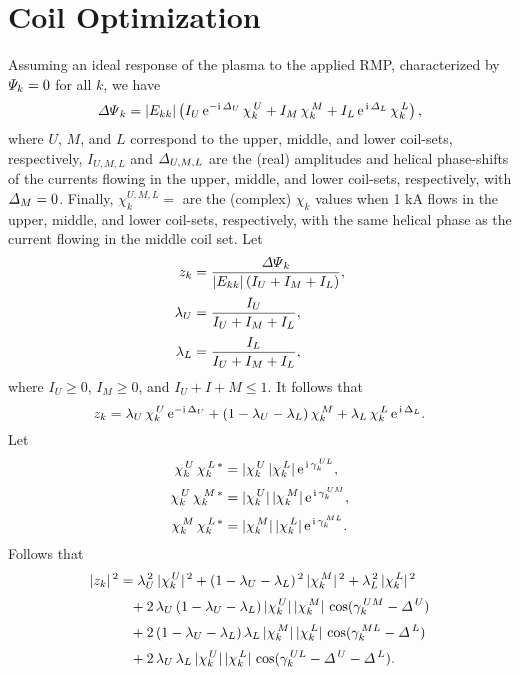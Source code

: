 \documentclass[12pt]{article}
\begin{document}
\section{Coil Optimization}
Assuming an ideal response of the plasma to the applied RMP, characterized by ${\mit\Psi}_k=0$ for all $k$, 
we have
\begin{equation}
{\mit\Delta\Psi}_k = |E_{kk}|\left(
  I_U \, {\rm e}^{-{\rm i}\,{\mit\Delta}_U}\,\chi_k^{\,U}
+I_M\,                                         \chi_k^{\,M}
+I_L \, {\rm e}^{\,{\rm i}\,{\mit\Delta}_L}\,\chi_k^{\,L}
\right),
\end{equation}
where $U$, $M$, and $L$ correspond to the upper, middle, and lower coil-sets, respectively, $I_{U,M,L}$ and ${\mit\Delta}_{U,M,L}$
are the (real) amplitudes and helical phase-shifts of the currents flowing in the upper, middle, and lower coil-sets, respectively, with ${\mit\Delta}_M=0$.  Finally, $\chi_k^{U,M,L}=$ are the (complex) $\chi_k$ values when 1 kA flows in the upper, middle, and lower coil-sets, respectively,
with the same helical phase as the current flowing in the middle coil set.
Let
\begin{align}
z_k& =\frac{ {\mit\Delta\Psi}_k }{ |E_{kk}|\,(I_U+I_M+I_L)},\\[0.5ex]
\lambda_U&=\frac{I_{U}}{I_U+I_{M}+I_L},\\[0.5ex]
\lambda_L&=\frac{I_{L}}{I_U+I_M+I_L},
\end{align}
where $I_U\geq 0$, $I_M\geq 0$, and $I_U+I+M \leq 1$. 
It follows that
\begin{equation}
z_k =\lambda_{U}\,\chi_k^{\,U}\,{\rm e}^{-{\rm i}\,\Delta_U}+(1-\lambda_U-\lambda_L)\,\chi_k^{\,M}+\lambda_{L}\,\chi_k^{\,L}
\,{\rm e}^{\,{\rm i}\,\Delta_L}.
\end{equation}
Let
\begin{align}
\chi_k^{\,U}\,\chi_k^{\,L\,\ast} &= |\chi_k^{\,U}\,|\chi_k^{\,L}|\,{\rm e}^{\,{\rm i}\,\gamma_k^{\,UL}},\\[0.5ex]
\chi_k^{\,U}\,\chi_k^{\,M\,\ast} &= |\chi_k^{\,U}|\,|\chi_k^{\,M}|\,{\rm e}^{\,{\rm i}\,\gamma_k^{\,UM}},\\[0.5ex]
\chi_k^{\,M}\,\chi_k^{\,L\,\ast} &= |\chi_k^{\,M}|\,|\chi_k^{\,L}|\,{\rm e}^{\,{\rm i}\,\gamma_k^{\,ML}}.
\end{align}
Follows that
\begin{align}
|z_k|^{\,2} &= \lambda_U^{\,2}\,|\chi_k^{\,U}|^{\,2}+ (1-\lambda_U-\lambda_L)^{\,2}\,|\chi_k^{\,M}|^{\,2} + \lambda_L^{\,2}\,|\chi_k^{\,L}|^{\,2}\nonumber\\[0.5ex]
&\phantom{=}+2\,\lambda_U\,(1-\lambda_U-\lambda_L)\,|\chi_k^{\,U}|\,|\chi_k^{\,M}|\,\cos(\gamma_k^{\,UM}-{\mit\Delta}^{\,U})\\[0.5ex]
&\phantom{=}+2\,(1-\lambda_U-\lambda_L)\,\lambda_L\,|\chi_k^{\,M}|\,|\chi_k^{\,L}|\,\cos(\gamma_k^{\,ML}-{\mit\Delta}^{\,L})\\[0.5ex]
&\phantom{=}+2\,\lambda_U\,\lambda_L\,|\chi_k^{\,U}|\,|\chi_k^{\,L}|\,\cos(\gamma_k^{\,UL}-{\mit\Delta}^{\,U}-{\mit\Delta}^{\,L}).
\end{align}
\end{document}
